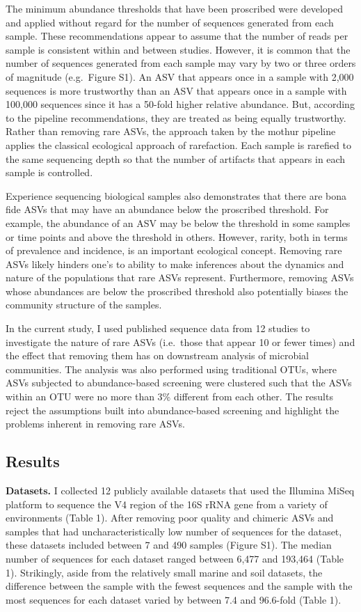 \documentclass[
]{article}
\begin{document}
The minimum abundance thresholds that have been proscribed were
developed and applied without regard for the number of sequences
generated from each sample. These recommendations appear to assume that
the number of reads per sample is consistent within and between studies.
However, it is common that the number of sequences generated from each
sample may vary by two or three orders of magnitude (e.g.~Figure S1). An
ASV that appears once in a sample with 2,000 sequences is more
trustworthy than an ASV that appears once in a sample with 100,000
sequences since it has a 50-fold higher relative abundance. But,
according to the pipeline recommendations, they are treated as being
equally trustworthy. Rather than removing rare ASVs, the approach taken
by the mothur pipeline applies the classical ecological approach of
rarefaction. Each sample is rarefied to the same sequencing depth so
that the number of artifacts that appears in each sample is controlled.

Experience sequencing biological samples also demonstrates that there
are bona fide ASVs that may have an abundance below the proscribed
threshold. For example, the abundance of an ASV may be below the
threshold in some samples or time points and above the threshold in
others. However, rarity, both in terms of prevalence and incidence, is
an important ecological concept. Removing rare ASVs likely hinders one's
to ability to make inferences about the dynamics and nature of the
populations that rare ASVs represent. Furthermore, removing ASVs whose
abundances are below the proscribed threshold also potentially biases
the community structure of the samples.

In the current study, I used published sequence data from 12 studies to
investigate the nature of rare ASVs (i.e.~those that appear 10 or fewer
times) and the effect that removing them has on downstream analysis of
microbial communities. The analysis was also performed using traditional
OTUs, where ASVs subjected to abundance-based screening were clustered
such that the ASVs within an OTU were no more than 3\% different from
each other. The results reject the assumptions built into
abundance-based screening and highlight the problems inherent in
removing rare ASVs.

\hypertarget{results}{%
\subsection{Results}\label{results}}

\textbf{Datasets.} I collected 12 publicly available datasets that used
the Illumina MiSeq platform to sequence the V4 region of the 16S rRNA
gene from a variety of environments (Table 1). After removing poor
quality and chimeric ASVs and samples that had uncharacteristically low
number of sequences for the dataset, these datasets included between 7
and 490 samples (Figure S1). The median number of sequences for each
dataset ranged between 6,477 and 193,464 (Table 1). Strikingly, aside
from the relatively small marine and soil datasets, the difference
between the sample with the fewest sequences and the sample with the
most sequences for each dataset varied by between 7.4 and 96.6-fold
(Table 1).
\end{document}
